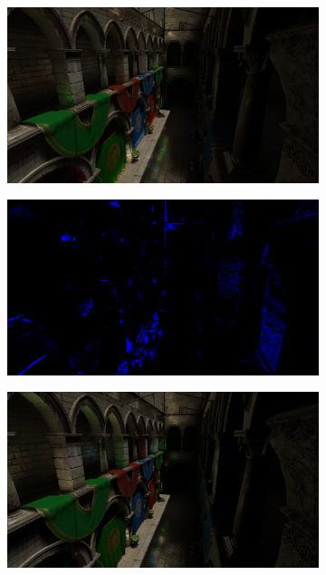 \begin{figure}[H]
	\par\smallskip
	\begin{subfigure}[b]{.49\linewidth}
		\centering
		\captionsetup{justification=centering}
		\includegraphics[width=\linewidth]{media/finals/sponza_gi_128.png}
	\end{subfigure}%
	\hspace{0.01\textwidth}
	\begin{subfigure}[b]{.49\linewidth}
		\centering
		\captionsetup{justification=centering}
		\includegraphics[width=\linewidth]{media/finals/sponza_gi_128_diff.png}
	\end{subfigure}%
	\par\smallskip
	\begin{subfigure}[b]{.49\linewidth}
		\centering
		\captionsetup{justification=centering}
		\includegraphics[width=\linewidth]{media/finals/sponza_gi_64.png}

\end{subfigure}
\end{figure}
